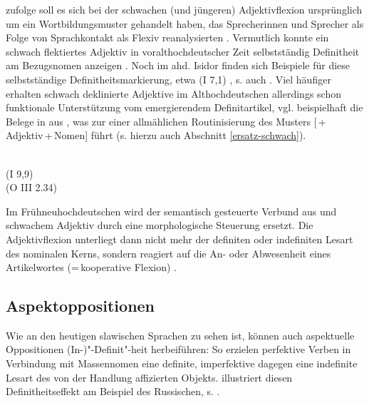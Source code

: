 \textcite[361ff.]{Braunmuller2008} zufolge soll es sich bei der schwachen (und jüngeren) Adjektivflexion ursprünglich um ein Wortbildungsmuster gehandelt haben, das Sprecherinnen und Sprecher als Folge von Sprachkontakt als Flexiv reanalysierten \parencite[zu alternativen Entstehungsszenarien s.][13--26]{Kovari1984}. Vermutlich konnte ein schwach flektiertes Adjektiv in voralthochdeutscher Zeit selbstständig Definitheit am Bezugsnomen anzeigen 
\parencites()()[69]{Demske2001}[364]{Braunmuller2008}. Noch im ahd. Isidor finden sich Beispiele für diese selbstständige Definitheitsmarkierung, etwa   (I 7,1) \parencite[226]{Braune2004}, s. auch \textcite[69f.]{Demske2001}. 
Viel häufiger erhalten schwach deklinierte Adjektive im Althochdeutschen allerdings schon funktionale Unterstützung vom emergierendem Definitartikel, vgl. beispielhaft die Belege in  aus \textcite[24,28]{Schrodt2004}, was zur einer allmählichen Routinisierung des Musters [\,+\,Adjektiv\,+\,Nomen] führt (s. hierzu auch Abschnitt \ref{ersatz-schwach}).

\begin{exe}
	\ex \label{ex:art-adj}   
	\begin{xlist}
		\ex \label{ex:art-adj1}  \\    (I 9,9) 
		\ex \label{ex:art-adj2}   \\  (O III 2.34)
		\end{xlist}
\end{exe}
 
Im Frühneuhochdeutschen wird der semantisch gesteuerte Verbund aus  und schwachem Adjektiv durch eine morphologische Steuerung ersetzt. Die Adjektivflexion unterliegt dann nicht mehr der definiten oder indefiniten Lesart des nominalen Kerns, sondern reagiert auf die An- oder Abwesenheit eines Artikelwortes (=\,kooperative Flexion) \parencite[s. hierzu ausführlich][]{Demske2001,Szczepaniak2011a}. 

\subsection{Aspektoppositionen} \label{sec:aspektoppo}

Wie an den heutigen slawischen Sprachen zu sehen ist, können auch aspektuelle Oppositionen (In-)"-Definit"-heit herbeiführen: So erzielen perfektive Verben in Verbindung mit Massennomen eine definite, imperfektive dagegen eine indefinite Lesart des von der Handlung affizierten Objekts. \textcite[11ff.]{Leiss2000} illustriert diesen Definitheitseffekt am Beispiel des Russischen, s. .

